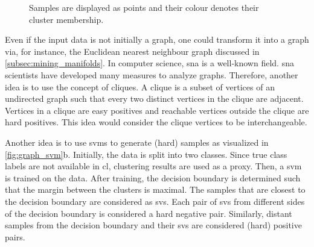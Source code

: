 \begin{figure}[!htb]%
    \centering
    \qquad
    \caption{Samples are displayed as points and their colour denotes their cluster membership.}%
    \label{fig:graph_svm}%
\end{figure}

Even if the input data is not initially a graph, one could transform it into a graph via, for instance, 
the Euclidean nearest neighbour graph discussed in \autoref{subsec:mining_manifolds}.
In computer science, \ac{sna} is a well-known field.
\ac{sna} scientists have developed many measures to analyze graphs.
Therefore, another idea is to use the concept of cliques.
A clique is a subset of vertices of an undirected graph such that every two distinct vertices in the clique are adjacent.
Vertices in a clique are easy positives and reachable vertices outside the clique are hard positives.
This idea would consider the clique vertices to be interchangeable.

Another idea is to use \acp{svm} to generate (hard) samples as visualized in \autoref{fig:graph_svm}b.
Initially, the data is split into two classes. 
Since true class labels are not available in \ac{cl}, clustering results are used as a proxy.
Then, a \ac{svm} is trained on the data.
After training, the decision boundary is determined such that 
the margin between the clusters is maximal.
The samples that are closest to the decision boundary are considered as \acp{sv}.
Each pair of \acp{sv} from different sides of the decision boundary is considered a hard negative pair.
Similarly, distant samples from the decision boundary and their \acp{sv} are considered (hard) positive pairs.

